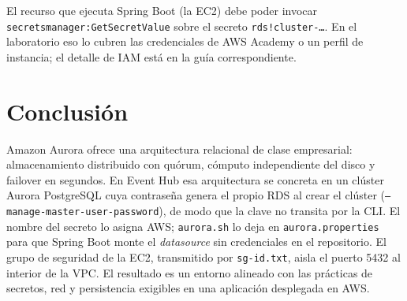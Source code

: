 \documentclass[12pt,a4paper]{article}
\begin{document}
El recurso que ejecuta Spring Boot (la EC2) debe poder invocar \texttt{secretsmanager:GetSecretValue} sobre el secreto \texttt{rds!cluster-\ldots}. En el laboratorio eso lo cubren las credenciales de AWS Academy o un perfil de instancia; el detalle de IAM está en la guía correspondiente.

\section{Conclusión}

Amazon Aurora ofrece una arquitectura relacional de clase empresarial: almacenamiento distribuido con quórum, cómputo independiente del disco y failover en segundos. En Event Hub esa arquitectura se concreta en un clúster Aurora PostgreSQL cuya contraseña genera el propio RDS al crear el clúster (\texttt{--manage-master-user-password}), de modo que la clave no transita por la CLI. El nombre del secreto lo asigna AWS; \texttt{aurora.sh} lo deja en \texttt{aurora.properties} para que Spring Boot monte el \textit{datasource} sin credenciales en el repositorio. El grupo de seguridad de la EC2, transmitido por \texttt{sg-id.txt}, aisla el puerto 5432 al interior de la VPC. El resultado es un entorno alineado con las prácticas de secretos, red y persistencia exigibles en una aplicación desplegada en AWS.


\theendnotes
\end{document}
